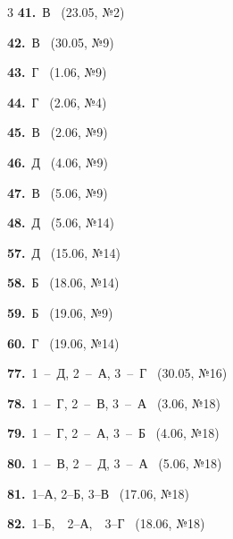 \documentclass[12pt]{article}
\begin{document}
\ifshowsolutions
{}
\begin{multicols}{3}\noindent
\noindent\textbf{41.}~В \ {\scriptsize\color{gray}(23.05, №2)}\par
\noindent\textbf{42.}~В \ {\scriptsize\color{gray}(30.05, №9)}\par
\noindent\textbf{43.}~Г \ {\scriptsize\color{gray}(1.06, №9)}\par
\noindent\textbf{44.}~Г \ {\scriptsize\color{gray}(2.06, №4)}\par
\noindent\textbf{45.}~В \ {\scriptsize\color{gray}(2.06, №9)}\par
\noindent\textbf{46.}~Д \ {\scriptsize\color{gray}(4.06, №9)}\par
\noindent\textbf{47.}~В \ {\scriptsize\color{gray}(5.06, №9)}\par
\noindent\textbf{48.}~Д \ {\scriptsize\color{gray}(5.06, №14)}\par
\noindent\textbf{57.}~Д \ {\scriptsize\color{gray}(15.06, №14)}\par
\noindent\textbf{58.}~Б \ {\scriptsize\color{gray}(18.06, №14)}\par
\noindent\textbf{59.}~Б \ {\scriptsize\color{gray}(19.06, №9)}\par
\noindent\textbf{60.}~Г \ {\scriptsize\color{gray}(19.06, №14)}\par
\noindent\textbf{77.}~1~--~Д, 2~--~А, 3~--~Г \ {\scriptsize\color{gray}(30.05, №16)}\par
\noindent\textbf{78.}~1~--~Г, 2~--~В, 3~--~А \ {\scriptsize\color{gray}(3.06, №18)}\par
\noindent\textbf{79.}~1~--~Г, 2~--~А, 3~--~Б \ {\scriptsize\color{gray}(4.06, №18)}\par
\noindent\textbf{80.}~1~--~В, 2~--~Д, 3~--~А \ {\scriptsize\color{gray}(5.06, №18)}\par
\noindent\textbf{81.}~1--А, 2--Б, 3--В \ {\scriptsize\color{gray}(17.06, №18)}\par
\noindent\textbf{82.}~1--Б,\ \ 2--А,\ \ 3--Г \ {\scriptsize\color{gray}(18.06, №18)}\par
\end{multicols}
\fi

\endgroup
\end{document}
